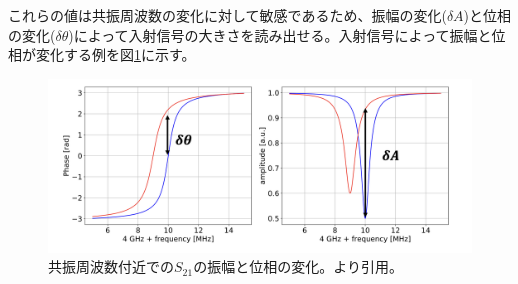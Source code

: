 これらの値は共振周波数の変化に対して敏感であるため、振幅の変化($\delta A$)と位相の変化($\delta\theta$)によって入射信号の大きさを読み出せる。入射信号によって振幅と位相が変化する例を図\ref{amp_and_phase}に示す。
\begin{figure}[htbp]
  \centering
  \includegraphics[width=1.0\columnwidth]{5_alignment/figs/amp_and_phase.png}
  \caption{共振周波数付近での$S_{21}$の振幅と位相の変化。\cite{sueno_doctor}より引用。}
  \label{amp_and_phase}
\end{figure}

